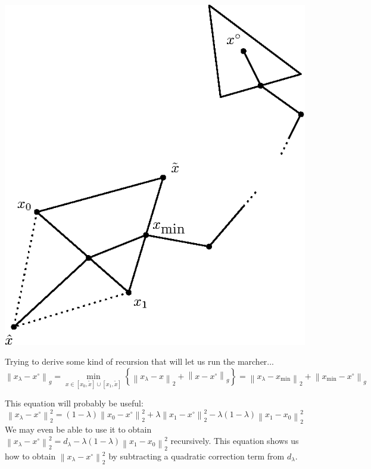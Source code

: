 \documentclass[12pt]{article}
\newcommand{\curlyb}[1]{\left\{#1\right\}}
\newcommand{\norm}[1]{\left\|#1\right\|}
\begin{document}
\begin{center}
  \includegraphics{recursion.eps}
\end{center}

Trying to derive some kind of recursion that will let us run the marcher...
\begin{equation}
  \norm{x_\lambda - x^\circ}_g = \min_{x \in [x_0, \tilde{x}] \cup [x_1, \tilde{x}]} \curlyb{\norm{x_\lambda - x}_2 + \norm{x - x^\circ}_g} = \norm{x_\lambda - x_{\operatorname{min}}}_2 + \norm{x_{\operatorname{\min}} - x^\circ}_g
\end{equation}

This equation will probably be useful:
\begin{equation}
  \norm{x_\lambda - x^\circ}_2^2 = (1-\lambda) \norm{x_0 - x^\circ}_2^2 + \lambda \norm{x_1 - x^\circ}_2^2 - \lambda(1-\lambda) \norm{x_1 - x_0}_2^2
\end{equation}
We may even be able to use it to obtain
$\norm{x_\lambda - x^\circ}_2^2 = d_\lambda - \lambda(1 - \lambda)
\norm{x_1 - x_0}_2^2$ recursively. This equation shows us how to
obtain $\norm{x_\lambda - x^\circ}_2^2$ by subtracting a quadratic
correction term from $d_\lambda$.
\end{document}
